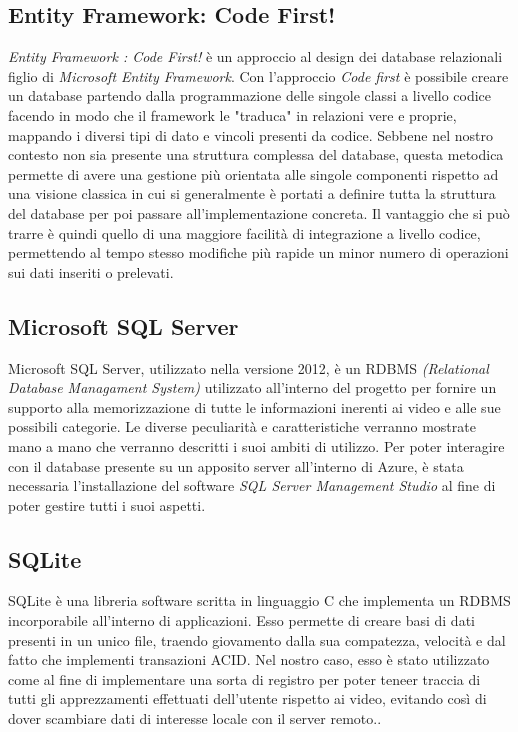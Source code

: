 \documentclass[a4]{book}
\begin{document}
\subsection{Entity Framework: Code First!}

\textit{Entity Framework : Code First!} è un approccio al design dei database relazionali figlio di \textit{Microsoft Entity Framework}. Con l'approccio \textit{Code first} è possibile creare un database partendo dalla programmazione delle singole classi a livello codice facendo in modo che il framework le "traduca" in relazioni vere e proprie, mappando i diversi tipi di dato e vincoli presenti da codice. Sebbene nel nostro contesto non sia presente una struttura complessa del database, questa metodica permette di avere una gestione più orientata alle singole componenti rispetto ad una visione classica in cui si generalmente è portati a definire tutta la struttura del database per poi passare all'implementazione concreta. Il vantaggio che si può trarre è quindi quello di una maggiore facilità di integrazione a livello codice, permettendo al tempo stesso modifiche più rapide un minor numero di operazioni sui dati inseriti o prelevati.


\subsection{Microsoft SQL Server}
Microsoft SQL Server, utilizzato nella versione 2012, è un RDBMS \textit{(Relational Database Managament System)} utilizzato all'interno del progetto per fornire un supporto alla memorizzazione di tutte le informazioni inerenti ai video e alle sue possibili categorie. Le diverse peculiarità e caratteristiche verranno mostrate mano a mano che verranno descritti i suoi ambiti di utilizzo. Per poter interagire con il database presente su un apposito server all'interno di Azure, è stata necessaria l'installazione del software \textit{SQL Server Management Studio} al fine di poter gestire tutti i suoi aspetti.


\subsection{SQLite}
SQLite è una libreria software scritta in linguaggio C che implementa un RDBMS incorporabile all'interno di applicazioni. Esso permette di creare basi di dati presenti in un unico file, traendo giovamento dalla sua compatezza, velocità e dal fatto che implementi transazioni ACID. Nel nostro caso, esso è stato utilizzato come al fine di implementare una sorta di registro per poter teneer traccia di tutti gli apprezzamenti effettuati dell'utente rispetto ai video, evitando così di dover scambiare dati di interesse locale con il server remoto..
\end{document}

